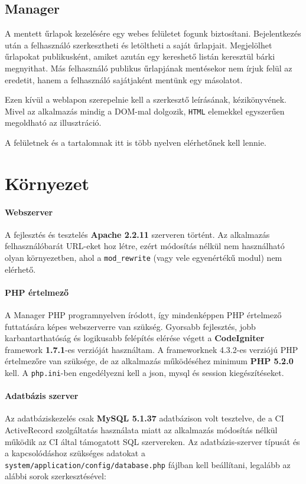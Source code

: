 \documentclass[12pt,a4paper,twoside]{article}
\begin{document}
\subsection{Manager}

A mentett űrlapok kezelésére egy webes felületet fogunk
biztosítani. Bejelentkezés után a felhasználó szerkesztheti és letöltheti a
saját űrlapjait. Megjelölhet űrlapokat publikusként, amiket azután
egy kereshető listán keresztül bárki megnyithat. Más felhasználó publikus
űrlapjának mentésekor nem írjuk felül az eredetit, hanem a felhasználó
sajátjaként mentünk egy másolatot.

Ezen kívül a weblapon szerepelnie kell a szerkesztő leírásának,
kézikönyvének. Mivel az alkalmazás mindig a DOM-mal\cite{DOM} dolgozik,
\texttt{HTML} elemekkel egyszerűen megoldható az illusztráció.

A felületnek és a tartalomnak itt is több nyelven elérhetőnek kell lennie.

\clearpage
{}
\section{Környezet}

\paragraph{Webszerver}
A fejlesztés és tesztelés \textbf{Apache 2.2.11} szerveren történt. Az
alkalmazás felhasználóbarát URL-eket hoz létre, ezért módosítás nélkül nem
használható olyan környezetben, ahol a \texttt{mod\_rewrite} (vagy vele
egyenértékű modul) nem elérhető.

\paragraph{PHP értelmező}
A Manager PHP programnyelven íródott, így mindenképpen PHP értelmező futtatására
képes webszerverre van szükség. Gyorsabb fejlesztés, jobb karbantarthatóság és
logikusabb felépítés elérése végett a \textbf{CodeIgniter}\cite{CI} framework
\textbf{1.7.1}-es verzióját használtam. A frameworknek 4.3.2-es verziójú
PHP értelmezőre van szüksége, de az alkalmazás működéséhez minimum \textbf{PHP
  5.2.0} kell. A \texttt{php.ini}-ben engedélyezni kell a json, mysql
és session kiegészítéseket.

\paragraph{Adatbázis szerver}
Az adatbáziskezelés csak \textbf{MySQL 5.1.37} adatbázison volt tesztelve, de a
CI ActiveRecord\cite{CI-ActiveRecord} szolgáltatás használata miatt az
alkalmazás módosítás nélkül működik az CI által támogatott SQL
szervereken\cite{CI-Req}. Az adatbázis-szerver típusát és a kapcsolódáshoz
szükséges adatokat a \texttt{system/application/config/database.php} fájlban
kell beállítani, legalább az alábbi sorok szerkesztésével:
\end{document}
